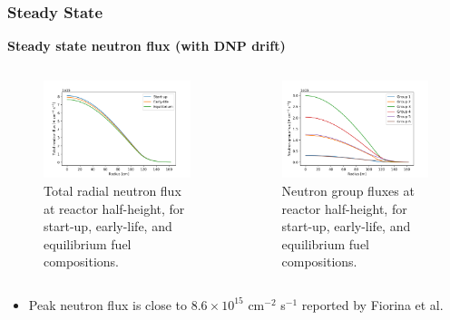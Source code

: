 \begin{frame}
	\frametitle{Steady State}
		\textbf{Steady state neutron flux (with \gls{DNP} drift)}
		\begin{columns}
			\column{5cm}
			\begin{figure}
				\small
				\centering
				\includegraphics[width=\textwidth]{../paper/figures/totalflux}
				\caption{\small Total radial neutron flux at reactor
				half-height, for start-up, early-life, and equilibrium fuel
				compositions.}
				\label{fig:totalflux}
			\end{figure}
			\column{5cm}
			\begin{figure}
				\small
				\centering
				\includegraphics[width=\textwidth]{../paper/figures/stflux}
				\caption{\small Neutron group fluxes at reactor half-height, for
				start-up, early-life, and equilibrium fuel compositions.}
				\label{fig:stflux}
			\end{figure}
		\end{columns}
		\begin{itemize}
			\item Peak neutron flux is close to $8.6 \times 10^{15}$ cm$^{-2}$
			s$^{-1}$ reported by Fiorina et al.
			\cite{fiorina_investigation_2013}
		\end{itemize}
\end{frame}

